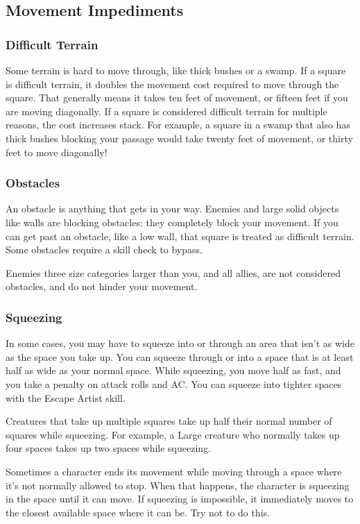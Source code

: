 \subsection{Movement Impediments}

\subsubsection{Difficult Terrain}
Some terrain is hard to move through, like thick bushes or a swamp. If a square is difficult terrain, it doubles the movement cost required to move through the square. That generally means it takes ten feet of movement, or fifteen feet if you are moving diagonally. If a square is considered difficult terrain for multiple reasons, the cost increases stack. For example, a square in a swamp that also has thick bushes blocking your passage would take twenty feet of movement, or thirty feet to move diagonally!

\subsubsection{Obstacles}
An obstacle is anything that gets in your way. Enemies and large solid objects like walls are blocking obstacles: they completely block your movement. If you can get past an obstacle, like a low wall, that square is treated as difficult terrain. Some obstacles require a skill check to bypass.

Enemies three size categories larger than you, and all allies, are not considered obstacles, and do not hinder your movement.

\subsubsection{Squeezing}

In some cases, you may have to squeeze into or through an area that isn't as wide as the space you take up. You can squeeze through or into a space that is at least half as wide as your normal space. While squeezing, you move half as fast, and you take a  penalty on attack rolls and AC. You can squeeze into tighter spaces with the Escape Artist skill.

Creatures that take up multiple squares take up half their normal number of squares while squeezing. For example, a Large creature who normally takes up four spaces takes up two spaces while squeezing.

 Sometimes a character ends its movement while moving through a space where it's not normally allowed to stop. When that happens, the character is squeezing in the space until it can move. If squeezing is impossible, it immediately moves to the closest available space where it can be. Try not to do this.

